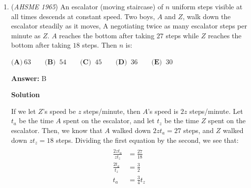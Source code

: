 \begin{enumerate}
 \textbf{Answer: }A



\textbf{Solution}

Let $h(y)=y^2+my+2$
$h(y)=y^2+my+2=f(y)(y-1)+R_1$
$h(y)=y^2+my+2=g(y)(y+1)+R_2$
$h(1)=3+m=R_1$
$h(-1)=3-m=R_2$
$m=0$

 Thus, the answer is $\boxed{\textbf{(A) }0}$.

 


 



\textbf{Solution 2}

As in the other solution, let $h(y)=y^2+my+2$. By dividing $h(y)$ by $(y-1)$ (through either \href{https://artofproblemsolving.com/wiki/index.php?title=Polynomial\_long\_division&action=edit&redlink=1}{long} or \href{https://artofproblemsolving.com/wiki/index.php?title=Synthetic\_division}{synthetic} division), we get a remainder $R_1=m+3$. Similarly, dividing $h(y)$ by $(y+1)$ yields the remainder $R_2=3-m$. Setting $R_1=R_2$, we see that $m+3=3-m$, which only holds when $m=0$, which corresponds to answer choice $\fbox{\textbf{(A)}}$.

 


	\item (\textit{AHSME 1965}) An escalator (moving staircase) of $n$ uniform steps visible at all times descends at constant speed. 
Two boys, $A$ and $Z$, walk down the escalator steadily as it moves, A negotiating twice as many escalator 
steps per minute as $Z$. $A$ reaches the bottom after taking $27$ steps while $Z$ reaches the bottom after taking $18$ steps. Then $n$ is: 


 $\textbf{(A)}\ 63 \qquad  \textbf{(B) }\ 54 \qquad  \textbf{(C) }\ 45 \qquad  \textbf{(D) }\ 36 \qquad  \textbf{(E) }\ 30$

 \textbf{Answer: }B



\textbf{Solution}

If we let $Z$'s speed be $z$ steps/minute, then $A$'s speed is $2z$ steps/minute. Let $t_a$ be the time $A$ spent on the escalator, and let $t_z$ be the time $Z$ spent on the escalator. Then, we know that $A$ walked down $2zt_a=27$ steps, and $Z$ walked down $zt_z=18$ steps. Dividing the first equation by the second, we see that:\begin{align*} \\\frac{2zt_a}{zt_z}&=\frac{27}{18} \\\frac{2t_a}{t_z}&=\frac{3}{2} \\t_a&=\frac{3}{4}t_z \\\end{align*}



\end{enumerate}
